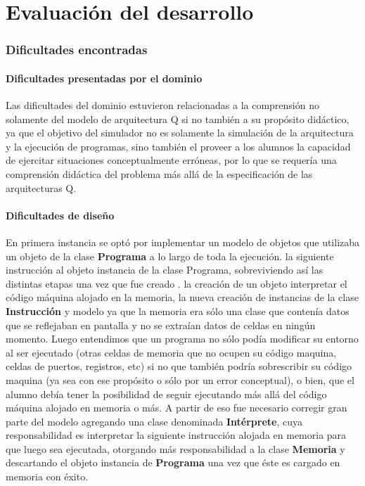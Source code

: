 \part{Evaluación del desarrollo}

\section{Dificultades encontradas}

\subsection{Dificultades presentadas por el dominio}
Las dificultades del dominio estuvieron relacionadas a la comprensión no solamente del modelo de arquitectura Q si no también a su propósito didáctico, ya que el objetivo del simulador no es solamente la simulación de la arquitectura y la ejecución de programas, sino también el proveer a los alumnos la capacidad de ejercitar situaciones conceptualmente erróneas, por lo que se requería una comprensión didáctica del problema más allá de la especificación de las arquitecturas Q. 

\subsection{Dificultades de diseño}
En primera instancia se optó por implementar un modelo de objetos que utilizaba un objeto de la clase \textbf{Programa} a lo largo de toda la ejecución.  la siguiente instrucción al objeto instancia de la clase Programa, sobreviviendo así las distintas etapas una vez que fue creado .  la creación de un objeto  interpretar el código máquina alojado en la memoria,  la nueva creación de instancias de la clase \textbf{Instrucción} y  modelo ya que la memoria era sólo una clase que contenía datos que se reflejaban en pantalla y no se extraían datos de celdas en ningún momento. Luego entendimos que un programa no sólo podía modificar su entorno al ser ejecutado (otras celdas de memoria que no ocupen su código maquina, celdas de puertos, registros, etc) si no que también podría sobrescribir su código maquina (ya sea con ese propósito o sólo por un error conceptual), o bien, que el alumno debía tener la posibilidad de seguir ejecutando más allá del código máquina alojado en memoria o más. A partir de eso fue necesario corregir gran parte del modelo agregando una clase denominada \textbf{Intérprete}, cuya responsabilidad es interpretar la siguiente instrucción alojada en memoria para que luego sea ejecutada, otorgando más responsabilidad a la clase \textbf{Memoria} y descartando el objeto instancia de \textbf{Programa} una vez que éste es cargado en memoria con éxito.\\

